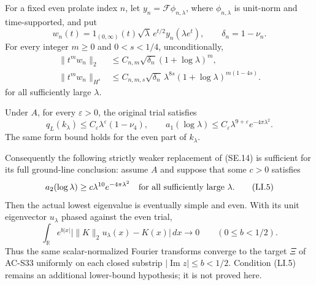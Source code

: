 \begin{theorem}
\label{AC-S47}
For a fixed even prolate index \(n\), let
\(y_n=\mathcal F\phi_{n,\lambda}\), where
\(\phi_{n,\lambda}\) is unit-norm and time-supported, and put
\[
 w_n(t)=1_{(0,\infty)}(t)\sqrt\lambda\,e^{t/2}
                  y_n(\lambda e^t),
 \qquad \delta_n=1-\nu_n.
 \tag{LI.2}
\]
For every integer \(m\ge0\) and \(0<s<1/4\), unconditionally,
\[
\begin{aligned}
 \|t^m w_n\|_2
       &\le C_{n,m}\sqrt{\delta_n}(1+\log\lambda)^m,\\
 \|t^m w_n\|_{H^s}
       &\le C_{n,m,s}\sqrt{\delta_n}\,
           \lambda^{8s}(1+\log\lambda)^{m(1-4s)}.
\end{aligned}
 \tag{LI.3}
\]
for all sufficiently large \(\lambda\).

Under \(A\), for every \(\varepsilon>0\), the original trial satisfies
\[
 q_L(k_\lambda)\le C_\varepsilon\lambda^\varepsilon
                                  (1-\nu_4),
 \qquad
 a_1(\log\lambda)\le C_\varepsilon
                     \lambda^{9+\varepsilon}e^{-4\pi\lambda^2}.
 \tag{LI.4}
\]
The same form bound holds for the even part of \(k_\lambda\).

Consequently the following strictly weaker replacement of (SE.14)
is sufficient for its full ground-line conclusion: assume \(A\) and
suppose that some \(c>0\) satisfies
\[
 a_2(\log\lambda)\ge
               c\lambda^{10}e^{-4\pi\lambda^2}
              \quad\hbox{for all sufficiently large }\lambda.
 \tag{LI.5}
\]
Then the actual lowest eigenvalue is eventually simple and even.
With its unit eigenvector \(u_\lambda\) phased against the even trial,
\[
 \int_{\mathbb R}e^{b|x|}
       \bigl|\|K\|_2u_\lambda(x)-K(x)\bigr|\,dx
                 \longrightarrow0
                  \qquad(0\le b<1/2).
 \tag{LI.6}
\]
Thus the same scalar-normalized Fourier transforms converge to the
target \(\Xi\) of AC-S33 uniformly on each closed substrip
\(|\operatorname{Im}z|\le b<1/2\).
Condition (LI.5) remains an additional lower-bound hypothesis;
it is not proved here.
\end{theorem}

